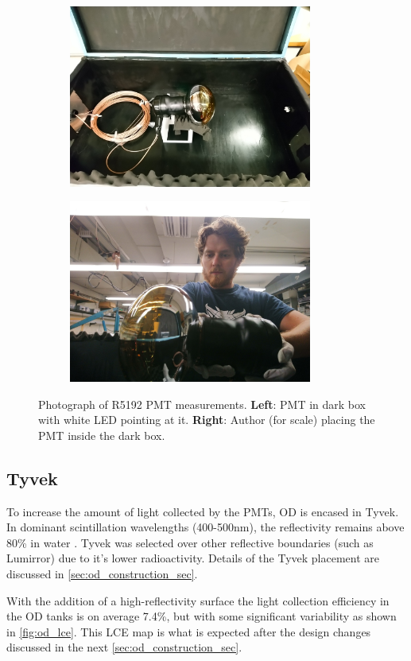 \begin{figure}[!htbp]
\begin{subfigure}{.5\textwidth}
  \centering
  \includegraphics[height=6cm, width=\linewidth]{Figures/OD_PMTs/od_pmt_in_dark_box.JPG}
  \end{subfigure}
  \begin{subfigure}{.5\textwidth}
  \centering
  \includegraphics[height=6cm, width=\linewidth]{Figures/OD_PMTs/sam_holding_od_pmt.JPG}
  \end{subfigure}
\caption{Photograph of R5192 PMT measurements. \textbf{Left}: PMT in dark box with white LED pointing at it. \textbf{Right}: Author (for scale) placing the PMT inside the dark box.}
\label{fig:od_pmt_brandeis_measurements}
\end{figure}


\subsection{Tyvek}
\par
To increase the amount of light collected by the PMTs, OD is encased in Tyvek.
In dominant scintillation wavelengths (400-500nm), the reflectivity remains above 80\% in water \cite{tyvek_thesis_ref,tyvek_reflectivity_ref}. 
Tyvek was selected over other reflective boundaries (such as Lumirror{\texttrademark}) due to it's lower radioactivity.
Details of the Tyvek placement are discussed in \autoref{sec:od_construction_sec}.
\par
With the addition of a high-reflectivity surface the light collection efficiency in the OD tanks is on average 7.4\%, but with some significant variability as shown in \autoref{fig:od_lce}.
This LCE map is what is expected after the design changes discussed in the next \autoref{sec:od_construction_sec}.

